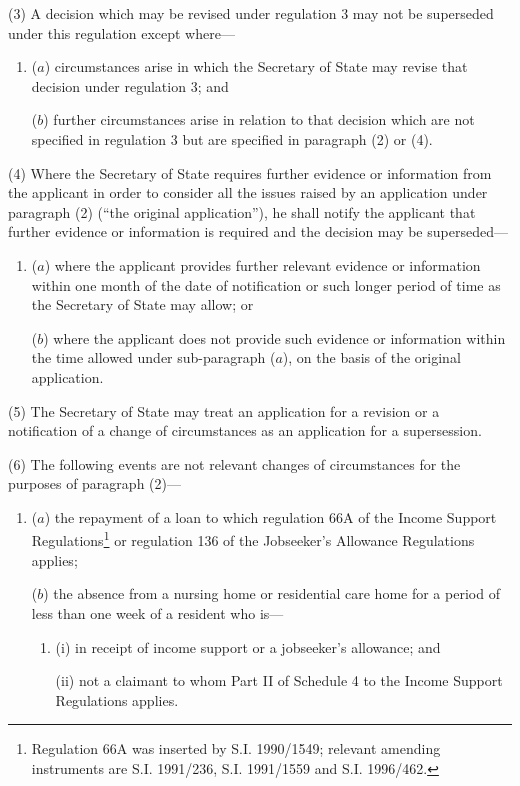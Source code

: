 \documentclass[12pt,a4paper]{article}
\begin{document}
(3) A decision which may be revised under regulation 3 may not be superseded under this regulation except where—
\begin{enumerate}\item[]
($a$) circumstances arise in which the Secretary of State may revise that decision under regulation 3; and

($b$) further circumstances arise in relation to that decision which are not specified in regulation 3 but are specified in paragraph (2) or (4).
\end{enumerate}

(4) Where the Secretary of State requires further evidence or information from the applicant in order to consider all the issues raised by an application under paragraph (2) (“the original application”), he shall notify the applicant that further evidence or information is required and the decision may be superseded—
\begin{enumerate}\item[]
($a$) where the applicant provides further relevant evidence or information within one month of the date of notification or such longer period of time as the Secretary of State may allow; or

($b$) where the applicant does not provide such evidence or information within the time allowed under sub-paragraph ($a$), on the basis of the original application.
\end{enumerate}

(5) The Secretary of State may treat an application for a revision or a notification of a change of circumstances as an application for a supersession.

(6) The following events are not relevant changes of circumstances for the purposes of paragraph (2)—
\begin{enumerate}\item[]
($a$) the repayment of a loan to which regulation 66A of the Income Support Regulations\footnote{\frenchspacing Regulation 66A was inserted by S.I. 1990/1549; relevant amending instruments are S.I. 1991/236, S.I. 1991/1559 and S.I. 1996/462.} or regulation 136 of the Jobseeker’s Allowance Regulations applies;

($b$) the absence from a nursing home or residential care home for a period of less than one week of a resident who is—
\begin{enumerate}\item[]
(i) in receipt of income support or a jobseeker’s allowance; and

(ii) not a claimant to whom Part II of Schedule 4 to the Income Support Regulations applies.
\end{enumerate}
\end{enumerate}
\end{document}
